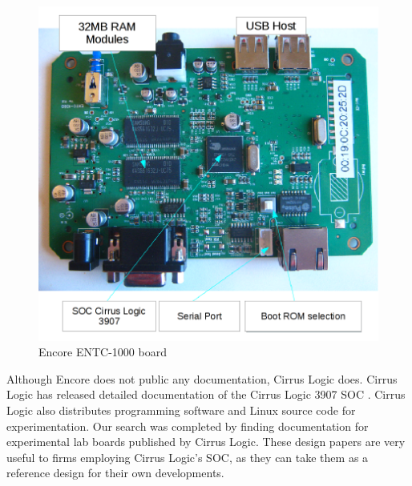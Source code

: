 \documentclass[conference]{IEEEtran}
\newcommand{\nota}[1]{}
\begin{document}
\begin{figure}
\begin{center}
\includegraphics[scale=0.40]{placa-encore-en.png}
\caption{Encore ENTC-1000 board}
\label{fig:placa-encore}
\end{center}
\end{figure}
\nota{
Afortunadamente para nuestra investigación,
la empresa Cirrus publica documentación detallada del SOC Cirrus 3907A \cite{cirrus}.
Junto con esta documentación Cirrus también publica software
para su programación, y código fuente de
Linux para experimentación. Completando la búsqueda, hemos encontrado
documentación de placas de laboratorios experimentales, que la fabrica Cirrus publica.
Estos diseños son muy útiles a las empresas que utilizan el SOC de Cirrus,
ya que lo pueden tomar como diseño de referencia para sus circuitos particulares.
}

Although Encore does not public any documentation, Cirrus Logic does. Cirrus Logic has released detailed documentation of the Cirrus Logic 3907 SOC \cite{cirrus}. Cirrus Logic also distributes programming software and Linux source code for experimentation. Our search was completed by finding documentation for experimental lab boards published by Cirrus Logic. These design papers are very useful to firms employing Cirrus Logic's SOC, as they can take them as a reference design for their own developments.
\end{document}
